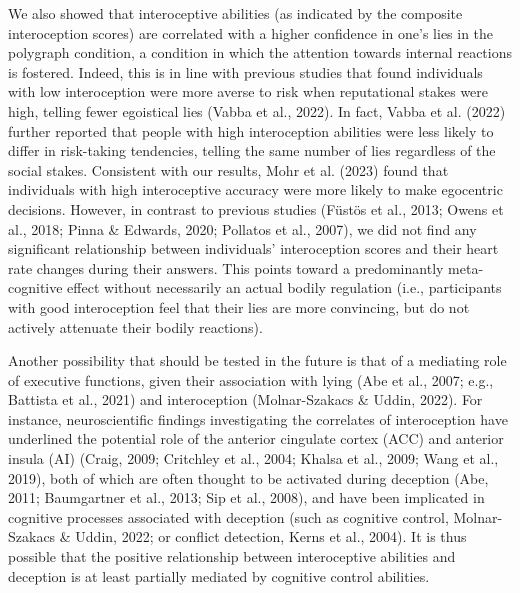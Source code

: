 \documentclass[
  man,mask,floatsintext]{apa6}
\begin{document}
We also showed that interoceptive abilities (as indicated by the composite interoception scores) are correlated with a higher confidence in one's lies in the polygraph condition, a condition in which the attention towards internal reactions is fostered. Indeed, this is in line with previous studies that found individuals with low interoception were more averse to risk when reputational stakes were high, telling fewer egoistical lies (Vabba et al., 2022). In fact, Vabba et al. (2022) further reported that people with high interoception abilities were less likely to differ in risk-taking tendencies, telling the same number of lies regardless of the social stakes. Consistent with our results, Mohr et al. (2023) found that individuals with high interoceptive accuracy were more likely to make egocentric decisions. However, in contrast to previous studies (Füstös et al., 2013; Owens et al., 2018; Pinna \& Edwards, 2020; Pollatos et al., 2007), we did not find any significant relationship between individuals' interoception scores and their heart rate changes during their answers. This points toward a predominantly meta-cognitive effect without necessarily an actual bodily regulation (i.e., participants with good interoception feel that their lies are more convincing, but do not actively attenuate their bodily reactions).

Another possibility that should be tested in the future is that of a mediating role of executive functions, given their association with lying (Abe et al., 2007; e.g., Battista et al., 2021) and interoception (Molnar-Szakacs \& Uddin, 2022). For instance, neuroscientific findings investigating the correlates of interoception have underlined the potential role of the anterior cingulate cortex (ACC) and anterior insula (AI) (Craig, 2009; Critchley et al., 2004; Khalsa et al., 2009; Wang et al., 2019), both of which are often thought to be activated during deception (Abe, 2011; Baumgartner et al., 2013; Sip et al., 2008), and have been implicated in cognitive processes associated with deception (such as cognitive control, Molnar-Szakacs \& Uddin, 2022; or conflict detection, Kerns et al., 2004). It is thus possible that the positive relationship between interoceptive abilities and deception is at least partially mediated by cognitive control abilities.
\end{document}
